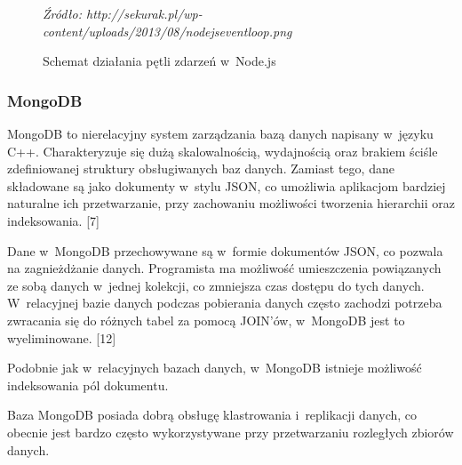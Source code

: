 \documentclass[12pt,a4paper,notitlepage]{article}
\begin{document}
\begin{figure}[H]
\begin{center}
\caption{Schemat działania pętli zdarzeń w~Node.js}
\end{center}
\textit{Źródło: http://sekurak.pl/wp-content/uploads/2013/08/nodejseventloop.png}
\end{figure}

\subsubsection{MongoDB}
MongoDB to nierelacyjny system zarządzania bazą danych napisany w~języku C++. Charakteryzuje się dużą skalowalnością, wydajnością oraz brakiem ściśle zdefiniowanej struktury obsługiwanych baz danych. Zamiast tego, dane składowane są jako dokumenty w~stylu JSON, co umożliwia aplikacjom bardziej naturalne ich przetwarzanie, przy zachowaniu możliwości tworzenia hierarchii oraz indeksowania. [7]

\par Dane w~MongoDB przechowywane są w~formie dokumentów JSON, co pozwala na zagnieżdżanie danych. Programista ma możliwość umieszczenia powiązanych ze sobą danych w~jednej kolekcji, co zmniejsza czas dostępu do tych danych. W~relacyjnej bazie danych podczas pobierania danych często zachodzi potrzeba zwracania się do różnych tabel za pomocą JOIN'ów, w~MongoDB jest to wyeliminowane. [12]

\par Podobnie jak w~relacyjnych bazach danych, w~MongoDB istnieje możliwość indeksowania pól dokumentu.

\par Baza MongoDB posiada dobrą obsługę klastrowania i~replikacji danych, co obecnie jest bardzo często wykorzystywane przy przetwarzaniu rozległych zbiorów danych.
\end{document}
